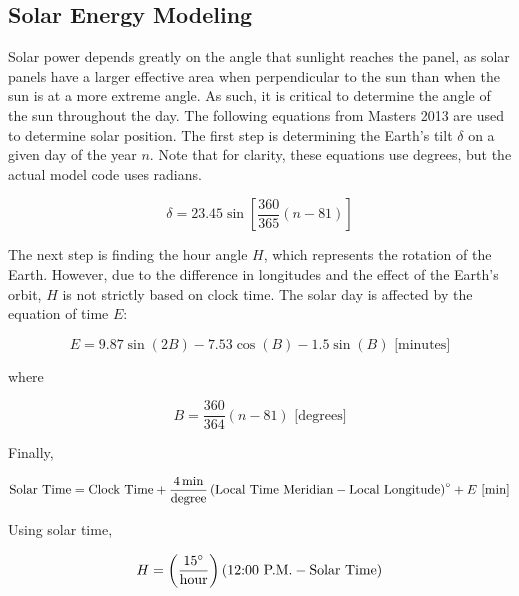 \documentclass{article}
\begin{document}
\subsection{Solar Energy Modeling}

Solar power depends greatly on the angle that sunlight reaches the panel, as solar panels have a larger effective area when perpendicular to the sun than when the sun is at a more extreme angle.  As such, it is critical to determine the angle of the sun throughout the day.  The following equations from Masters 2013 are used to determine solar position.\cite{Masters2013}  The first step is determining the Earth's tilt $\delta$ on a given day of the year $n$.  Note that for clarity, these equations use degrees, but the actual model code uses radians.

\begin{equation}
\delta = 23.45 \sin\left[\frac{360}{365} \left(n-81\right)\right]
\label{eq:declination}
\end{equation}

The next step is finding the hour angle $H$, which represents the rotation of the Earth.  However, due to the difference in longitudes and the effect of the Earth's orbit, $H$ is not strictly based on clock time.  The solar day is affected by the equation of time $E$:

\begin{equation}
E = 9.87 \sin(2 B) - 7.53 \cos(B) - 1.5 \sin(B) \mbox{ [minutes]}
\label{eq:eqn_time}
\end{equation}

where

\begin{equation}
B = \frac{360}{364}\left(n-81\right)\mbox{ [degrees]}
\label{eq:eqn_time2}
\end{equation}

Finally,

\begin{equation}
\mbox{Solar Time} = \mbox{Clock Time} + \frac{\SI{4}{\minute}}{\mbox{degree}}\left(\mbox{Local Time Meridian} - \mbox{Local Longitude}\right)\degree + E\mbox{ [min]}
\label{eq:solar_time}
\end{equation}

Using solar time,

\begin{equation}
H = \left(\frac{15\degree}{\mbox{hour}}\right)(\mbox{12:00 P.M.} - \mbox{Solar Time})
\label{eq:hr_angle}
\end{equation}
\end{document}
